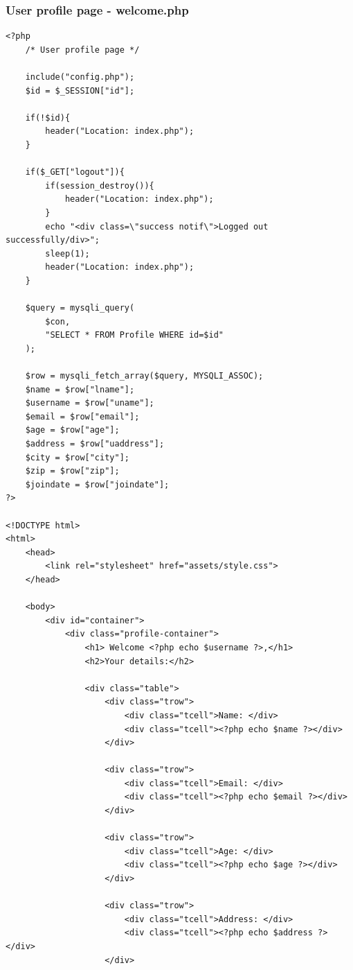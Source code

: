 \documentclass{article}
\begin{document}
\subsubsection{User profile page - welcome.php}
\begin{verbatim}
<?php
    /* User profile page */
    
    include("config.php");
    $id = $_SESSION["id"];

    if(!$id){
        header("Location: index.php");
    }

    if($_GET["logout"]){
        if(session_destroy()){
            header("Location: index.php");
        }
        echo "<div class=\"success notif\">Logged out successfully/div>";
        sleep(1);
        header("Location: index.php");
    }

    $query = mysqli_query(
        $con,
        "SELECT * FROM Profile WHERE id=$id"
    );

    $row = mysqli_fetch_array($query, MYSQLI_ASSOC);
    $name = $row["lname"];
    $username = $row["uname"];
    $email = $row["email"];
    $age = $row["age"];
    $address = $row["uaddress"];
    $city = $row["city"];
    $zip = $row["zip"];
    $joindate = $row["joindate"];
?>

<!DOCTYPE html>
<html>
	<head>
		<link rel="stylesheet" href="assets/style.css">
    </head>
    
	<body>
		<div id="container">
            <div class="profile-container">
                <h1> Welcome <?php echo $username ?>,</h1>
                <h2>Your details:</h2>

                <div class="table">
                    <div class="trow">
                        <div class="tcell">Name: </div>
                        <div class="tcell"><?php echo $name ?></div>
                    </div>

                    <div class="trow">
                        <div class="tcell">Email: </div>
                        <div class="tcell"><?php echo $email ?></div>
                    </div>

                    <div class="trow">
                        <div class="tcell">Age: </div>
                        <div class="tcell"><?php echo $age ?></div>
                    </div>

                    <div class="trow">
                        <div class="tcell">Address: </div>
                        <div class="tcell"><?php echo $address ?></div>
                    </div>


\end{verbatim}
\end{document}
